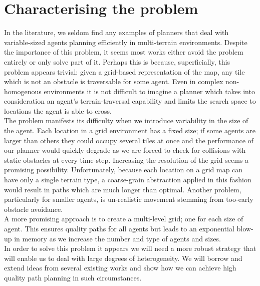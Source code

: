 \section{Characterising the problem}
In the literature, we seldom find any examples of planners that deal with variable-sized agents planning efficiently in multi-terrain environments. Despite the importance of this problem, it seems most works either avoid the problem entirely or only solve part of it. Perhaps this is because, superficially, this problem appears trivial: given a grid-based representation of the map, any tile which is not an obstacle is traversable for some agent. Even in complex non-homogenous environments it is not difficult to imagine a planner which takes into consideration an agent's terrain-traversal capability and limits the search space to locations the agent is able to cross. \\ \newline
The problem manifests its difficulty when we introduce variability in the size of the agent. Each location in a grid environment has a fixed size; if some agents are larger than others they could occupy several tiles at once and the performance of our planner would quickly degrade as we are forced to check for collisions with static obstacles at every time-step. Increasing the resolution of the grid seems a promising possibility. Unfortunately, because each location on a grid map can have only a single terrain type, a coarse-grain abstraction applied in this fashion would result in paths which are much longer than optimal. Another problem, particularly for smaller agents, is un-realistic movement stemming from too-early obstacle avoidance. \\ 
A more promising approach is to create a multi-level grid; one for each size of agent. This ensures quality paths for all agents but leads to an exponential blow-up in memory as we increase the number and type of agents and sizes. \\ \newline
In order to solve this problem it appears we will need a more robust strategy that will enable us to deal with large degrees of heterogeneity. We will borrow and extend ideas from several existing works and show how we can achieve high quality path planning in such circumstances.

